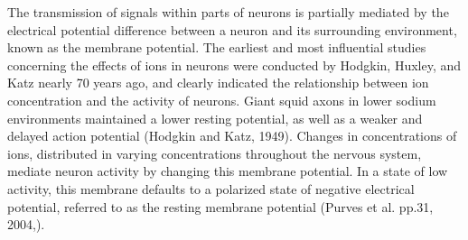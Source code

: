 \documentclass[11pt]{article}
\begin{document}


The transmission of signals within parts of neurons is partially mediated by the electrical potential difference between a neuron and its surrounding environment, known as the membrane potential. The earliest and most influential studies concerning the effects of ions in neurons were conducted by Hodgkin, Huxley, and Katz nearly 70 years ago, and clearly indicated the relationship between ion concentration and the activity of neurons. Giant squid axons in lower sodium environments maintained a lower resting potential, as well as a weaker and delayed action potential (Hodgkin and Katz, 1949). 
Changes in concentrations of ions, distributed in varying concentrations throughout the nervous system, mediate neuron activity by changing this membrane potential. In a state of low activity, this membrane defaults to a polarized state of negative electrical potential, referred to as the resting membrane potential (Purves et al. pp.31, 2004,).\par
\end{document}
